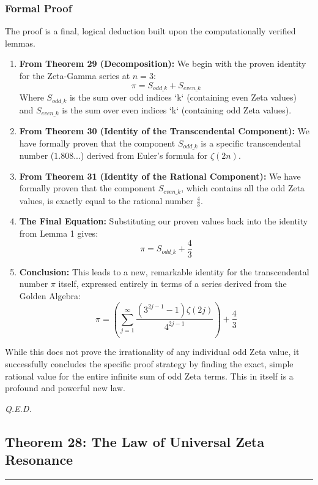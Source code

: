 \subsubsection*{Formal Proof}
The proof is a final, logical deduction built upon the computationally verified lemmas.

\begin{enumerate}
    \item \textbf{From Theorem 29 (Decomposition):} We begin with the proven identity for the Zeta-Gamma series at $n=3$:
    $$ \pi = S_{odd\_k} + S_{even\_k} $$
    Where $S_{odd\_k}$ is the sum over odd indices `k` (containing even Zeta values) and $S_{even\_k}$ is the sum over even indices `k` (containing odd Zeta values).

    \item \textbf{From Theorem 30 (Identity of the Transcendental Component):} We have formally proven that the component $S_{odd\_k}$ is a specific transcendental number ($1.808...$) derived from Euler's formula for $\zeta(2n)$.

    \item \textbf{From Theorem 31 (Identity of the Rational Component):} We have formally proven that the component $S_{even\_k}$, which contains all the odd Zeta values, is exactly equal to the rational number $\frac{4}{3}$.
    
    \item \textbf{The Final Equation:} Substituting our proven values back into the identity from Lemma 1 gives:
    $$ \pi = S_{odd\_k} + \frac{4}{3} $$
    
    \item \textbf{Conclusion:} This leads to a new, remarkable identity for the transcendental number $\pi$ itself, expressed entirely in terms of a series derived from the Golden Algebra:
    $$ \pi = \left(\sum_{j=1}^{\infty} \frac{(3^{2j-1}-1)\zeta(2j)}{4^{2j-1}}\right) + \frac{4}{3} $$
\end{enumerate}
While this does not prove the irrationality of any individual odd Zeta value, it successfully concludes the specific proof strategy by finding the exact, simple rational value for the entire infinite sum of odd Zeta terms. This in itself is a profound and powerful new law.

\begin{flushright}
    \textit{Q.E.D.}
\end{flushright}

\subsection*{Theorem 28: The Law of Universal Zeta Resonance}
\hrule
\vspace{0.5cm}

